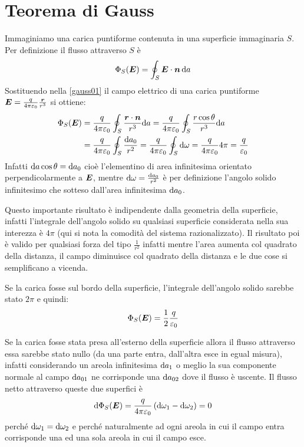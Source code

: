 \section{Teorema di Gauss}
\label{teorema_di_gauss}
Immaginiamo una carica puntiforme contenuta in una superficie immaginaria $S$. Per definizione il flusso attraverso $S$ è
\begin{equation}
  \Phi_S(\boldsymbol{E})=\oint_S\boldsymbol{E}\cdot\boldsymbol{n}\,\mathrm{d} a
  \label{gauss01}
\end{equation}
Sostituendo nella \eqref{gauss01} il campo elettrico di una carica puntiforme $\boldsymbol{E}=\frac{q}{4\pi\varepsilon_0}\frac{\boldsymbol{r}}{r^3}$ si ottiene:
\begin{align*}
  \Phi_S(\boldsymbol{E}) & =\frac{q}{4\pi\varepsilon_0}\oint_S\frac{\boldsymbol{r}\cdot\boldsymbol{n}}{r^3}\mathrm{d} a=\frac{q}{4\pi\varepsilon_0}\oint_S\frac{r\cos\theta}{r^3}\mathrm{d} a                         \\
                & =\frac{q}{4\pi\varepsilon_0}\oint_S\frac{\mathrm{d} a_0}{r^2}=\frac{q}{4\pi\varepsilon_0}\oint_S\mathrm{d}\omega=\frac{q}{4\pi\varepsilon_0}4\pi=\frac{q}{\varepsilon_0}
\end{align*}
Infatti $\mathrm{d} a\cos\theta=\mathrm{d} a_0$ cioè l'elementino di area infinitesima orientato perpendicolarmente a $\boldsymbol{E}$, mentre $\mathrm{d} \omega=\frac{\mathrm{d} a_0}{r^2}$ è per definizione l'angolo solido infinitesimo che sotteso dall'area infinitesima $\mathrm{d} a_0$.

Questo importante risultato è indipendente dalla geometria della superficie, infatti l'integrale dell'angolo solido su qualsiasi superficie considerata nella sua interezza è $4\pi$ (qui si nota la comodità del sistema razionalizzato). Il risultato poi è valido per qualsiasi forza del tipo $\frac{1}{r^2}$ infatti mentre l'area aumenta col quadrato della distanza, il campo diminuisce col quadrato della distanza e le due cose si semplificano a vicenda.

Se la carica fosse sul bordo della superficie, l'integrale dell'angolo solido sarebbe stato $2\pi$ e quindi:
\[\Phi_S(\boldsymbol{E})=\frac{1}{2}\frac{q}{\varepsilon_0}\]

Se la carica fosse stata presa all'esterno della superficie allora il flusso attraverso essa sarebbe stato nullo (da una parte entra, dall'altra esce in egual misura), infatti considerando un areola infinitesima $\mathrm{d} a_1$ o meglio la sua componente normale al campo $\mathrm{d} a_{01}$ ne corrisponde una $\mathrm{d} a_{02}$ dove il flusso è uscente. Il flusso netto attraverso queste due superfici è \[\mathrm{d}\Phi_S(\boldsymbol{E})=\frac{q}{4\pi\varepsilon_0}\left(\mathrm{d}\omega_1-\mathrm{d}\omega_2\right)=0\]
perché $\mathrm{d}\omega_1=\mathrm{d}\omega_2$ e perché naturalmente ad ogni areola in cui il campo entra corrisponde una ed una sola areola in cui il campo esce.

